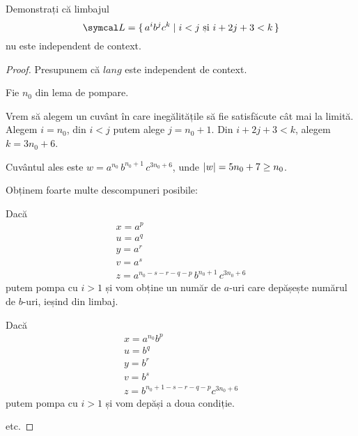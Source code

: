 \begin{exercise}
    Demonstrați că limbajul
    \[\limbaj = \set{ a^i b^j c^k | i < j \text{ și } i + 2j + 3 < k }\]
    nu este independent de context.
\end{exercise}
\begin{proof}
    Presupunem că \(lang\) este independent de context.

    Fie \(n_0\) din lema de pompare.

    Vrem să alegem un cuvânt în care inegălitățile să fie satisfăcute cât mai la limită.
    Alegem \(i = n_0\), din \(i < j\) putem alege \(j = n_0 + 1\).
    Din \(i + 2j + 3 < k\), alegem \(k = 3 n_0 + 6\).

    Cuvântul ales este \(w = a^{n_0} \, b^{n_0 + 1} \, c^{3 n_0 + 6}\), unde \(\left\lvert w\right\rvert = 5 n_0 + 7 \geq n_0\).

    Obținem foarte multe descompuneri posibile:

    Dacă
    \begin{gather*}
        x = a^p \\
        u = a^q \\
        y = a^r \\
        v = a^s \\
        z = a^{n_0 - s - r - q - p} \, b^{n_0 + 1} \, c^{3 n_0 + 6}
    \end{gather*}
    putem pompa cu \(i > 1\) și vom obține un număr de \(a\)-uri care depășește numărul de \(b\)-uri, ieșind din limbaj.

    Dacă
    \begin{gather*}
        x = a^{n_0} b^p \\
        u = b^q \\
        y = b^r \\
        v = b^s \\
        z = b^{n_0 + 1 - s - r - q - p} c^{3 n_0 + 6}
    \end{gather*}
    putem pompa cu \(i > 1\) și vom depăși a doua condiție.

    etc.
\end{proof}


